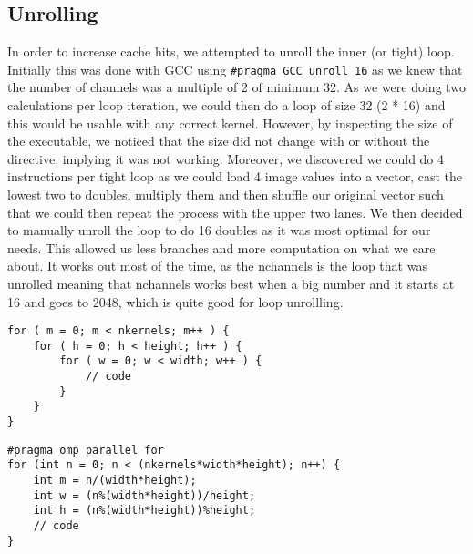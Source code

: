 \documentclass[12pt,fleqn,leqno,letterpaper]{article}
\begin{document}
\subsection{Unrolling}
In order to increase cache hits, we attempted to unroll the inner (or tight) loop. Initially this was done 
with GCC using \lstinline{#pragma GCC unroll 16} as we knew that the number of channels was a multiple of 2 of minimum 32.
As we were doing two calculations per loop iteration, we could then do a loop of size 32 (2 * 16) and this would
be usable with any correct kernel. However, by inspecting the size of the executable, we noticed that the size did not change
with or without the directive, implying it was not working. Moreover, we discovered we could do 4 instructions per tight loop
as we could load 4 image values into a vector, cast the lowest two to doubles, multiply them and then shuffle our original vector
such that we could then repeat the process with the upper two lanes. We then decided to manually unroll the loop to do 16 doubles
as it was most optimal for our needs. This allowed us less branches and more computation on what we care about. It works out most
of the time, as the nchannels is the loop that was unrolled meaning that nchannels works best when a big number and it starts at
16 and goes to 2048, which is quite good for loop unrollling. 

\begin{verbatim}
for ( m = 0; m < nkernels; m++ ) {
    for ( h = 0; h < height; h++ ) {
        for ( w = 0; w < width; w++ ) {
            // code
        }
    }
}
\end{verbatim}

\begin{verbatim}
#pragma omp parallel for
for (int n = 0; n < (nkernels*width*height); n++) {
    int m = n/(width*height);
    int w = (n%(width*height))/height;
    int h = (n%(width*height))%height;
    // code
}
\end{verbatim}
\end{document}
